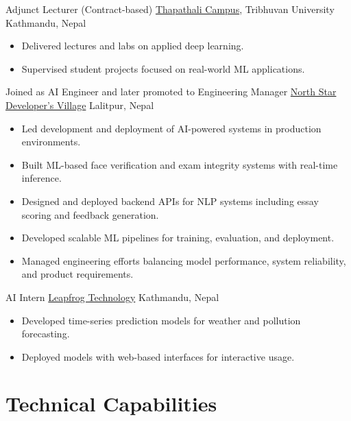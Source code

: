 \documentclass[11pt,a4paper,sans]{moderncv}
\begin{document}
{Adjunct Lecturer (Contract-based)}
{\href{https://tcioe.edu.np/}{Thapathali Campus}, Tribhuvan University}
{Kathmandu, Nepal}
{}
{
\begin{itemize}
\item Delivered lectures and labs on applied deep learning.
\item Supervised student projects focused on real-world ML applications.
\end{itemize}
}

{Joined as AI Engineer and later promoted to Engineering Manager}
{\href{https://www.nsdevil.com/?lang=en}{North Star Developer's Village}}
{Lalitpur, Nepal}
{}
{
\begin{itemize}
\item Led development and deployment of AI-powered systems in production environments.
\item Built ML-based face verification and exam integrity systems with real-time inference.
\item Designed and deployed backend APIs for NLP systems including essay scoring and feedback generation.
\item Developed scalable ML pipelines for training, evaluation, and deployment.
\item Managed engineering efforts balancing model performance, system reliability, and product requirements.
\end{itemize}
}

{AI Intern}
{\href{https://www.lftechnology.com/}{Leapfrog Technology}}
{Kathmandu, Nepal}
{}
{
\begin{itemize}
\item Developed time-series prediction models for weather and pollution forecasting.
\item Deployed models with web-based interfaces for interactive usage.
\end{itemize}
}

\section{Technical Capabilities}



\end{document}
